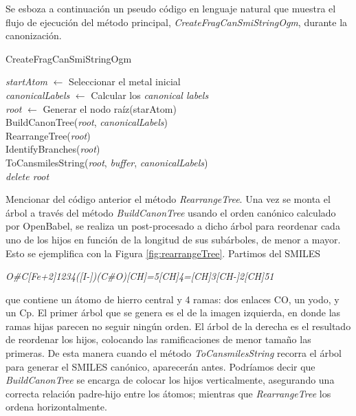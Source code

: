 Se esboza a continuación un pseudo código en lenguaje natural que muestra el flujo de ejecución del método principal, \textit{CreateFragCanSmiStringOgm}, durante la canonización. 
\begin{algorithm}[h!]
   \caption{CreateFragCanSmiStringOgm}
   \textit{startAtom} $\longleftarrow$ Seleccionar el metal inicial \\
   \textit{canonicalLabels} $\longleftarrow$ Calcular los \textit{canonical labels}\\
   \textit{root} $\longleftarrow$ Generar el nodo raíz(starAtom)\\
   BuildCanonTree(\textit{root}, \textit{canonicalLabels})\\
   RearrangeTree(\textit{root})\\
   IdentifyBranches(\textit{root})\\
   ToCansmilesString(\textit{root}, \textit{buffer}, \textit{canonicalLabels})\\
   \textit{delete root} \\
   \label{tab:CreateFragCanSmiStringOgm}
\end{algorithm}

Mencionar del código anterior el método \textit{RearrangeTree}. Una vez se monta el árbol a través del método \textit{BuildCanonTree} usando el orden canónico calculado por OpenBabel, se realiza un post-procesado a dicho árbol para reordenar cada uno de los hijos en función de la longitud de sus subárboles, de menor a mayor. Esto se ejemplifica con la Figura \ref{fig:rearrangeTree}. Partimos del SMILES

\begin{center}
\small
\textit{O\#C[Fe+2]1234([I-])(C\#O)[CH]=5[CH]4=[CH]3[CH-]2[CH]51}    
\end{center}

que contiene un átomo de hierro central y 4 ramas: dos enlaces CO, un yodo, y un Cp. El primer árbol que se genera es el de la imagen izquierda, en donde las ramas hijas parecen no seguir ningún orden. El árbol de la derecha es el resultado de reordenar los hijos, colocando las ramificaciones de menor tamaño las primeras. De esta manera cuando el método \textit{ToCansmilesString} recorra el árbol para generar el SMILES canónico,  aparecerán antes. Podríamos decir que \textit{BuildCanonTree} se encarga de colocar los hijos verticalmente, asegurando una correcta relación padre-hijo entre los átomos; mientras que \textit{RearrangeTree} los ordena horizontalmente.

